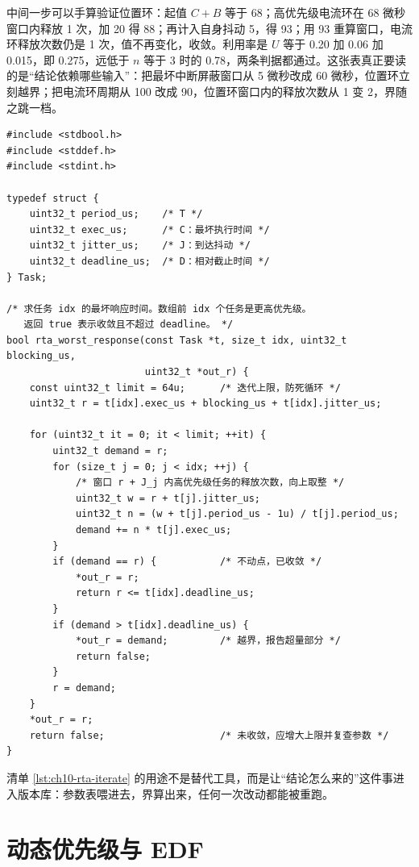 \documentclass[12pt,a4paper,fontset=fandol]{ctexbook}
\begin{document}
中间一步可以手算验证位置环：起值 $C + B$ 等于 68；高优先级电流环在 68 微秒窗口内释放 1 次，加 20 得 88；再计入自身抖动 5，得 93；用 93 重算窗口，电流环释放次数仍是 1 次，值不再变化，收敛。利用率是 $U$ 等于 0.20 加 0.06 加 0.015，即 0.275，远低于 $n$ 等于 3 时的 0.78，两条判据都通过。这张表真正要读的是“结论依赖哪些输入”：把最坏中断屏蔽窗口从 5 微秒改成 60 微秒，位置环立刻越界；把电流环周期从 100 改成 90，位置环窗口内的释放次数从 1 变 2，界随之跳一档。

\begin{lstlisting}[style=cstyle,caption={C：固定优先级响应时间迭代（含高优先级任务与阻塞项）},label={lst:ch10-rta-iterate}]
#include <stdbool.h>
#include <stddef.h>
#include <stdint.h>

typedef struct {
    uint32_t period_us;    /* T */
    uint32_t exec_us;      /* C：最坏执行时间 */
    uint32_t jitter_us;    /* J：到达抖动 */
    uint32_t deadline_us;  /* D：相对截止时间 */
} Task;

/* 求任务 idx 的最坏响应时间。数组前 idx 个任务是更高优先级。
   返回 true 表示收敛且不超过 deadline。 */
bool rta_worst_response(const Task *t, size_t idx, uint32_t blocking_us,
                        uint32_t *out_r) {
    const uint32_t limit = 64u;      /* 迭代上限，防死循环 */
    uint32_t r = t[idx].exec_us + blocking_us + t[idx].jitter_us;

    for (uint32_t it = 0; it < limit; ++it) {
        uint32_t demand = r;
        for (size_t j = 0; j < idx; ++j) {
            /* 窗口 r + J_j 内高优先级任务的释放次数，向上取整 */
            uint32_t w = r + t[j].jitter_us;
            uint32_t n = (w + t[j].period_us - 1u) / t[j].period_us;
            demand += n * t[j].exec_us;
        }
        if (demand == r) {           /* 不动点，已收敛 */
            *out_r = r;
            return r <= t[idx].deadline_us;
        }
        if (demand > t[idx].deadline_us) {
            *out_r = demand;         /* 越界，报告超量部分 */
            return false;
        }
        r = demand;
    }
    *out_r = r;
    return false;                    /* 未收敛，应增大上限并复查参数 */
}
\end{lstlisting}

清单 \ref{lst:ch10-rta-iterate} 的用途不是替代工具，而是让“结论怎么来的”这件事进入版本库：参数表喂进去，界算出来，任何一次改动都能被重跑。

\section{动态优先级与 EDF}
\end{document}
